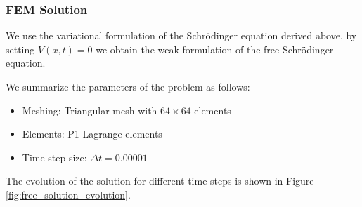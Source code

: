 \documentclass{article}
\theoremstyle{definition}
\theoremstyle{plain}
\theoremstyle{remark}
\begin{document}
\subsubsection*{FEM Solution}

We use the variational formulation of the Schrödinger equation derived above, by setting $V(x,t) = 0$ we obtain the weak formulation of the free Schrödinger equation.

We summarize the parameters of the problem as follows:

\begin{itemize}
  \item Meshing: Triangular mesh with $64 \times 64$ elements
  \item Elements: P1 Lagrange elements
  \item Time step size: $\Delta t = 0.00001$
\end{itemize}

The evolution of the solution for different time steps is shown in Figure \ref{fig:free_solution_evolution}.
\end{document}
